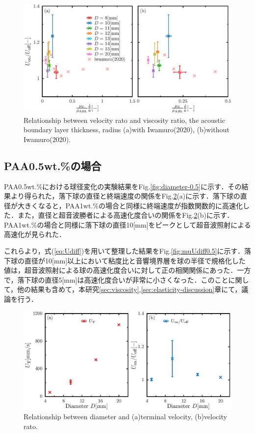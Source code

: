 \begin{figure}[ht]
    \centering
    \includegraphics[width=1\textwidth]{./5-Results/mu_Udiff.eps}
    \caption{Relationship between velocity rato and viscosity ratio, the acoustic boundary layer thickness, radius (a)with Iwamuro(2020), (b)without Iwamuro(2020).}
    \label{fig:muUdiff}
\end{figure}

\newpage

\subsection{PAA0.5wt.\%の場合}
PAA0.5wt.\%における球径変化の実験結果をFig.\ref{fig:diameter-0.5}に示す．その結果より得られた，落下球の直径と終端速度の関係をFig.\ref{fig:diaUT0.5}(a)に示す．落下球の直径が大きくなると，PAA1wt.\%の場合と同様に終端速度が指数関数的に高速化した．また，直径と超音波勝者による高速化度合いの関係をFig.\ref{fig:diaUT0.5}(b)に示す．PAA1wt.\%の場合と同様に落下球の直径10[mm]をピークとして超音波照射による高速化が見られた．

これらより，式(\ref{eq:Udiff})を用いて整理した結果をFig.\ref{fig:muUdiff0.5}に示す．落下球の直径が10[mm]以上において粘度比と音響境界層を球の半径で規格化した値は，超音波照射による球の高速化度合いに対して正の相関関係にあった．一方で，落下球の直径5[mm]は高速化度合いが非常に小さくなった．このことに関して，他の結果も含めて，本研究\ref{sec:viscosity},\ref{sec:elasticity-discussion}章にて，議論を行う．
\begin{figure}[ht]
    \centering
    \includegraphics[width=1\textwidth]{./5-Results/diameter-0.5/diaUT_Udiff.eps}
    \caption{Relationship between diameter and (a)terminal velocity, (b)velocity rato.}
    \label{fig:diaUT0.5}
\end{figure}

